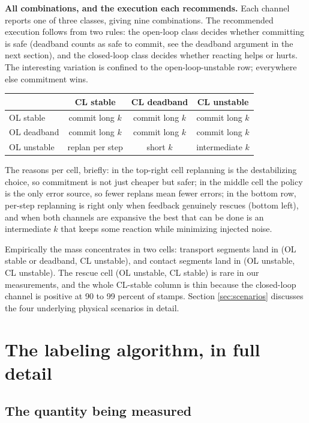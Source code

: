 \documentclass[11pt]{article}
\begin{document}
\textbf{All combinations, and the execution each recommends.} Each channel
reports one of three classes, giving nine combinations. The recommended
execution follows from two rules: the open-loop class decides whether
committing is safe (deadband counts as safe to commit, see the deadband
argument in the next section), and the closed-loop class decides whether
reacting helps or hurts. The interesting variation is confined to the
open-loop-unstable row; everywhere else commitment wins.

\begin{center}
\small
\begin{tabular}{@{}lccc@{}}
\toprule
 & CL stable & CL deadband & CL unstable \\
\midrule
OL stable   & commit long $k$ & commit long $k$ & commit long $k$ \\
OL deadband & commit long $k$ & commit long $k$ & commit long $k$ \\
OL unstable & replan per step & short $k$      & intermediate $k$ \\
\bottomrule
\end{tabular}
\end{center}

The reasons per cell, briefly: in the top-right cell replanning is the
destabilizing choice, so commitment is not just cheaper but safer; in the
middle cell the policy is the only error source, so fewer replans mean fewer
errors; in the bottom row, per-step replanning is right only when feedback
genuinely rescues (bottom left), and when both channels are expansive the
best that can be done is an intermediate $k$ that keeps some reaction while
minimizing injected noise.

Empirically the mass concentrates in two cells: transport segments land in
(OL stable or deadband, CL unstable), and contact segments land in
(OL unstable, CL unstable). The rescue cell (OL unstable, CL stable) is rare
in our measurements, and the whole CL-stable column is thin because the
closed-loop channel is positive at 90 to 99 percent of stamps. Section
\ref{sec:scenarios} discusses the four underlying physical scenarios in
detail.

\section{The labeling algorithm, in full detail}

\subsection{The quantity being measured}
\end{document}
